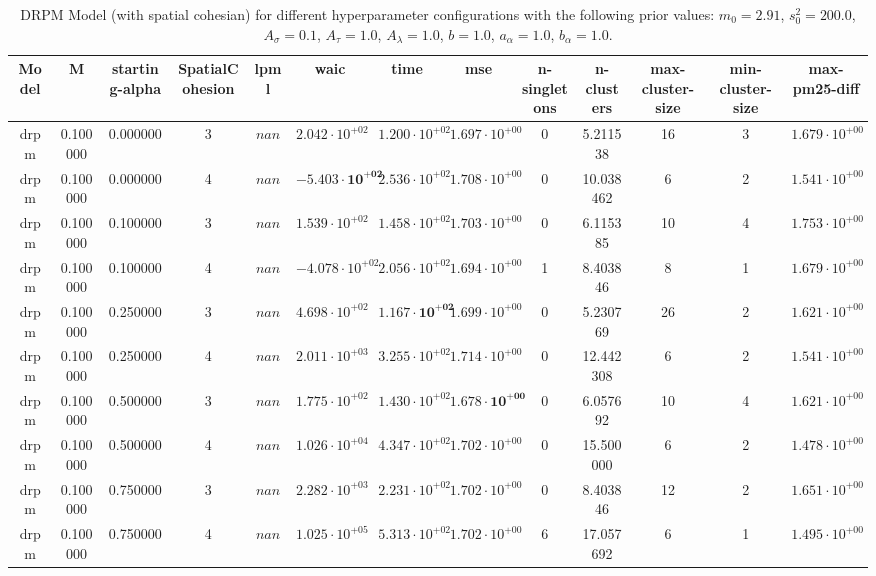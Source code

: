 \begin{table}
\caption{DRPM Model (with spatial cohesian) for different hyperparameter configurations with the following prior values: $m_0 = 2.91$, $s_0^2 = 200.0$, $A_\sigma = 0.1$, $A_\tau = 1.0$, $A_\lambda = 1.0$, $b = 1.0$, $a_\alpha = 1.0$, $b_\alpha = 1.0$.}
\centering\begin{tabular}{ccccccccccccc}
\toprule
Model & M & starting-alpha & SpatialCohesion & lpml & waic & time & mse & n-singletons & n-clusters & max-cluster-size & min-cluster-size & max-pm25-diff \\
\midrule
drpm & 0.100000 & 0.000000 & 3 & $nan$ & $2.042 \cdot 10^{+02}$ & $1.200 \cdot 10^{+02}$ & $1.697 \cdot 10^{+00}$ & 0 & 5.211538 & 16 & 3 & $1.679 \cdot 10^{+00}$ \\
drpm & 0.100000 & 0.000000 & 4 & $nan$ & $\mathbf{-5.403 \cdot 10^{+02}}$ & $2.536 \cdot 10^{+02}$ & $1.708 \cdot 10^{+00}$ & 0 & 10.038462 & 6 & 2 & $1.541 \cdot 10^{+00}$ \\
drpm & 0.100000 & 0.100000 & 3 & $nan$ & $1.539 \cdot 10^{+02}$ & $1.458 \cdot 10^{+02}$ & $1.703 \cdot 10^{+00}$ & 0 & 6.115385 & 10 & 4 & $1.753 \cdot 10^{+00}$ \\
drpm & 0.100000 & 0.100000 & 4 & $nan$ & $-4.078 \cdot 10^{+02}$ & $2.056 \cdot 10^{+02}$ & $1.694 \cdot 10^{+00}$ & 1 & 8.403846 & 8 & 1 & $1.679 \cdot 10^{+00}$ \\
drpm & 0.100000 & 0.250000 & 3 & $nan$ & $4.698 \cdot 10^{+02}$ & $\mathbf{1.167 \cdot 10^{+02}}$ & $1.699 \cdot 10^{+00}$ & 0 & 5.230769 & 26 & 2 & $1.621 \cdot 10^{+00}$ \\
drpm & 0.100000 & 0.250000 & 4 & $nan$ & $2.011 \cdot 10^{+03}$ & $3.255 \cdot 10^{+02}$ & $1.714 \cdot 10^{+00}$ & 0 & 12.442308 & 6 & 2 & $1.541 \cdot 10^{+00}$ \\
drpm & 0.100000 & 0.500000 & 3 & $nan$ & $1.775 \cdot 10^{+02}$ & $1.430 \cdot 10^{+02}$ & $\mathbf{1.678 \cdot 10^{+00}}$ & 0 & 6.057692 & 10 & 4 & $1.621 \cdot 10^{+00}$ \\
drpm & 0.100000 & 0.500000 & 4 & $nan$ & $1.026 \cdot 10^{+04}$ & $4.347 \cdot 10^{+02}$ & $1.702 \cdot 10^{+00}$ & 0 & 15.500000 & 6 & 2 & $1.478 \cdot 10^{+00}$ \\
drpm & 0.100000 & 0.750000 & 3 & $nan$ & $2.282 \cdot 10^{+03}$ & $2.231 \cdot 10^{+02}$ & $1.702 \cdot 10^{+00}$ & 0 & 8.403846 & 12 & 2 & $1.651 \cdot 10^{+00}$ \\
drpm & 0.100000 & 0.750000 & 4 & $nan$ & $1.025 \cdot 10^{+05}$ & $5.313 \cdot 10^{+02}$ & $1.702 \cdot 10^{+00}$ & 6 & 17.057692 & 6 & 1 & $1.495 \cdot 10^{+00}$ \\

\end{tabular}
\end{table}
